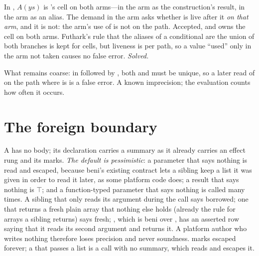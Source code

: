 In , $A(\mathit{ys})$ is 's cell on both arms---in
the  arm as the construction's result, in the  arm as an alias. The demand in the
 arm asks whether  is live after it \emph{on that arm}, and it is not: the
 arm's use of  is not on the  path. Accepted, and  owns the cell
on both arms. Futhark's rule that the aliases of a conditional are the union of both branches
\citep[Fig.~5]{henriksen2017futhark} is kept for cells, but liveness is per path, so a value ``used''
only in the arm not taken causes no false error. \emph{Solved.}

What remains coarse: in  followed by \code{[ …xs, 1 ]}, both 
and  must be unique, so a later read of  on the path where  is  is a
false error. A known imprecision; the evaluation counts how often it occurs.

\section{The foreign boundary}
\label{sec:hard-foreign}

A  has no body; its declaration carries a summary as it already carries an effect rung
and its  marks. \emph{The default is pessimistic}: a parameter that says nothing is read and
escaped, because beni's existing contract lets a sibling keep a list it was given in order to read it
later, as some platform code does; a result that says nothing is $\top$; and a function-typed parameter
that says nothing is called many times. A sibling that only reads its argument during the call says
borrowed; one that returns a fresh plain array that nothing else holds (already the rule for arrays a
sibling returns) says fresh; , which is beni over , has an asserted row saying
that it reads its second argument and returns it. A platform author who writes nothing therefore loses
precision and never soundness.  marks  escaped forever; a  that
passes a list is a call with no summary, which reads and escapes it.

